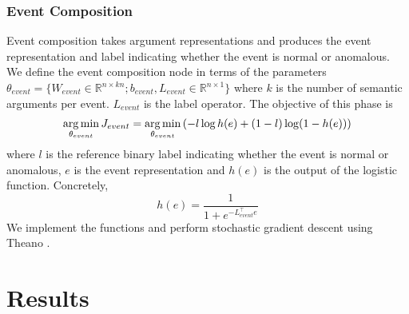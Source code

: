 \subsubsection{Event Composition}
Event composition takes argument representations and produces the event
representation and label indicating whether the event is
normal or anomalous.  We define the event composition node in terms of the
parameters $\theta_{event} = \{W_{event} \in \mathbb{R}^{n \times kn}; b_{event},
L_{event} \in \mathbb{R}^{n \times 1}\}$
where $k$ is the number of semantic arguments per event.  $L_{event}$ is the
label operator.  The objective of this
phase is 
\begin{align*}
\begin{aligned}
\operatorname*{arg\,min}_{\theta_{event}} J_{event} = \operatorname*{arg\,min}_{\theta_{event}} \left( - l \log h(e) + (1-l) \log (1 - h(e)) \right)
\end{aligned}
\end{align*}
where $l$ is the reference binary label indicating whether the event is normal or
anomalous, $e$ is the event representation and
$h(e)$ is the output of the logistic function.  Concretely,
\begin{equation*}
 h(e) = \frac{1}{1+e^{-L_{event}^\intercal e}}
\end{equation*}
We implement the functions and perform stochastic gradient descent using Theano
\cite{bergstra2010theano}.

\section{Results}
